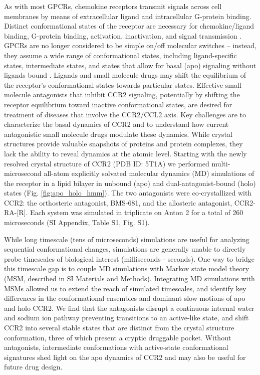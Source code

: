 \documentclass[9pt,twocolumn,twoside]{pnas-new}
\begin{document}
As with most GPCRs, chemokine receptors transmit signals across cell membranes by means of extracellular ligand and intracellular G-protein binding.
Distinct conformational states of the receptor are necessary for chemokine/ligand binding, G-protein binding, activation, inactivation, and signal transmission \cite{Latorraca2017, Venkatakrishnan2013, Zhang2018}.
GPCRs are no longer considered to be simple on/off molecular switches -- instead, they assume a wide range of conformational states, including ligand-specific states, intermediate states, and states that allow for basal (apo) signaling without ligands bound \cite{Venkatakrishnan2013, Katritch2013, Manglik2015, Katritch2012, Malik2013, Yao2009, Nygaard2013, Bockenhauer2011}.
Ligands and small molecule drugs may shift the equilibrium of the receptor's conformational states towards particular states.
Effective small molecule antagonists that inhibit CCR2 signaling, potentially by shifting the receptor equilibrium toward inactive conformational states, are desired for treatment of diseases that involve the CCR2/CCL2 axis.
Key challenges are to characterize the basal dynamics of CCR2 and to understand how current antagonistic small molecule drugs modulate these dynamics.
While crystal structures provide valuable snapshots of proteins and protein complexes, they lack the ability to reveal dynamics at the atomic level.
Starting with the newly resolved crystal structure of CCR2 (PDB ID: 5T1A) we performed multi-microsecond all-atom explicitly solvated molecular dynamics (MD) simulations of the receptor in a lipid bilayer in unbound (apo) and dual-antagonist-bound (holo) states (Fig. \ref{fig:apo_holo_hmm}).
The two antagonists were co-crystallized with CCR2: the orthosteric antagonist, BMS-681, and the allosteric antagonist, CCR2-RA-[R].
Each system was simulated in triplicate on Anton 2 \cite{Shaw2014} for a total of 260 microseconds (SI Appendix, Table S1, Fig. S1).

While long timescale (tens of microseconds) simulations are useful for analyzing sequential conformational changes, simulations are generally unable to directly probe timescales of biological interest (milliseconds - seconds)\cite{Bowman2011}.
One way to bridge this timescale gap is to couple MD simulations with Markov state model theory\cite{Swope2004, Singhal2004, Malmstrom2014, Amaro2018, Amaro2018a, Bowman2014, Noe2007, Prinz2011a, Schutte1999} (MSM, described in SI Materials and Methods).
Integrating  MD simulations with MSMs allowed us to extend the reach of simulated timescales, and identify key differences in the conformational ensembles and dominant slow motions of apo and holo CCR2.
We find that the antagonists disrupt a continuous internal water and sodium ion pathway preventing transitions to an active-like state, and shift CCR2 into several stable states that are distinct from the crystal structure conformation, three of which present a cryptic druggable pocket.
Without antagonists, intermediate conformations with active-state conformational signatures shed light on the apo dynamics of CCR2 and may also be useful for future drug design.
\end{document}

